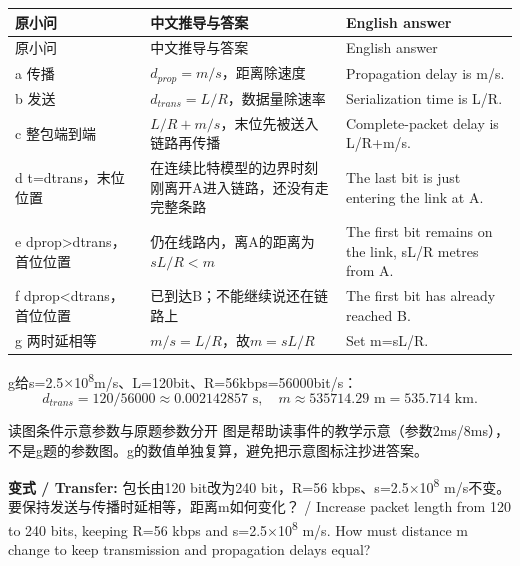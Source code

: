


\begingroup
\small\setlength{\tabcolsep}{3pt}
\renewcommand{\arraystretch}{1.22}
\begin{longtable}{@{}>{\raggedright\arraybackslash}p{}>{\raggedright\arraybackslash}p{}>{\raggedright\arraybackslash}p{}@{}}
\toprule
原小问 & 中文推导与答案 & English answer \\
\midrule\endfirsthead
原小问 & 中文推导与答案 & English answer \\
\midrule\endhead
\bottomrule\endfoot
a 传播 & \(d_{prop}=m/s\)，距离除速度 & Propagation delay is m/s. \\
b 发送 & \(d_{trans}=L/R\)，数据量除速率 & Serialization time is L/R. \\
c 整包端到端 & \(L/R+m/s\)，末位先被送入链路再传播 & Complete-packet delay is L/R+m/s. \\
d t=dtrans，末位位置 & 在连续比特模型的边界时刻刚离开A进入链路，还没有走完整条路 & The last bit is just entering the link at A. \\
e dprop>dtrans，首位位置 & 仍在线路内，离A的距离为\(sL/R\lt m\) & The first bit remains on the link, sL/R metres from A. \\
f dprop<dtrans，首位位置 & 已到达B；不能继续说还在链路上 & The first bit has already reached B. \\
g 两时延相等 & \(m/s=L/R\)，故\(m=sL/R\) & Set m=sL/R. \\
\end{longtable}
\endgroup


g给s=2.5\ensuremath{\times}10\textsuperscript{8}m/s、L=120bit、R=56kbps=56000bit/s：
\[
d_{trans}=120/56000\approx0.002142857\text{ s},\quad m\approx535714.29\text{ m}=535.714\text{ km}.\tag{A1.1}
\]




\begin{StudyBlock}{读图条件}{示意参数与原题参数分开}
图是帮助读事件的教学示意（参数2ms/8ms），不是g题的参数图。g的数值单独复算，避免把示意图标注抄进答案。
\end{StudyBlock}


\textbf{变式 / Transfer:} 包长由120 bit改为240 bit，R=56 kbps、s=2.5\ensuremath{\times}10\textsuperscript{8} m/s不变。要保持发送与传播时延相等，距离m如何变化？ / Increase packet length from 120 to 240 bits, keeping R=56 kbps and s=2.5\ensuremath{\times}10\textsuperscript{8} m/s. How must distance m change to keep transmission and propagation delays equal?



